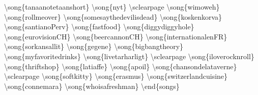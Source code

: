 \documentclass{article}%
\begin{document}
\textbackslash{}song\{tanaanotetaanshort\}\newline%
\textbackslash{}song\{nyt\}\newline%
\textbackslash{}sclearpage\newline%
\textbackslash{}song\{wimoweh\}\newline%
\textbackslash{}song\{rollmeover\}\newline%
\textbackslash{}song\{somesaythedevilisdead\}\newline%
\textbackslash{}song\{koskenkorva\}\newline%
\textbackslash{}song\{santianoPerv\}\newline%
\textbackslash{}song\{fastfood\}\newline%
\textbackslash{}song\{diggydiggyhole\}\newline%
\textbackslash{}song\{eurovisionCH\}\newline%
\textbackslash{}song\{beercannonCH\}\newline%
\textbackslash{}song\{internationalenFR\}\newline%
\textbackslash{}song\{sorkansallit\}\newline%
\textbackslash{}song\{gegene\}\newline%
\textbackslash{}song\{bigbangtheory\}\newline%
\textbackslash{}song\{myfavoritedrinks\}\newline%
\textbackslash{}song\{livetarharligt\}\newline%
\textbackslash{}sclearpage\newline%
\textbackslash{}song\{iloverocknroll\}\newline%
\textbackslash{}song\{thriftshop\}\newline%
\textbackslash{}song\{latiaffe\}\newline%
\textbackslash{}song\{apoil\}\newline%
\textbackslash{}song\{chansondelataverne\}\newline%
\textbackslash{}sclearpage\newline%
\textbackslash{}song\{softkitty\}\newline%
\textbackslash{}song\{erasmus\}\newline%
\textbackslash{}song\{switzerlandcuisine\}\newline%
\textbackslash{}song\{connemara\}\newline%
\textbackslash{}song\{whoisafreshman\}\newline%
\newline%
\textbackslash{}end\{songs\}\newline%
\end{document}
